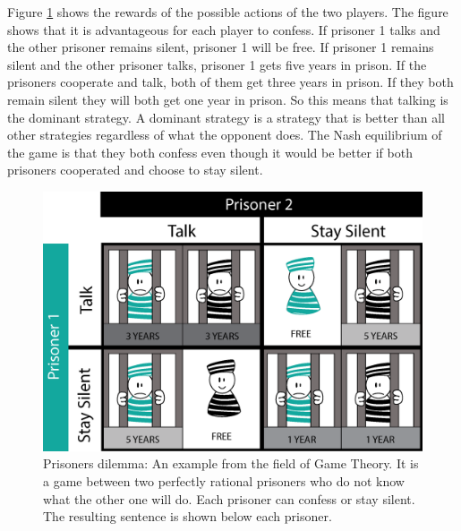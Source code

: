 Figure \ref{Prison} shows the rewards of the possible actions of the two players. The figure shows that it is advantageous for each player to confess. If prisoner 1 talks and the other prisoner remains silent, prisoner 1 will be free. If prisoner 1 remains silent and the other prisoner talks, prisoner 1 gets five years in prison. If the prisoners cooperate and talk, both of them get three years in prison. If they both remain silent they will both get one year in prison. So this means that talking is the dominant strategy. A dominant strategy is a strategy that is better than all other strategies regardless of what the opponent does. The Nash equilibrium of the game is that they both confess even though it would be better if both prisoners cooperated and choose to stay silent. 

\begin{figure}[hbtp]
\centering
\includegraphics[scale=0.6]{Images/PrisDilemma}
\caption{Prisoners dilemma: An example from the field of Game Theory. It is a game between two perfectly rational prisoners who do not know what the other one will do. Each prisoner can confess or stay silent. The resulting sentence is shown below each prisoner. }
\label{Prison}
\end{figure}


